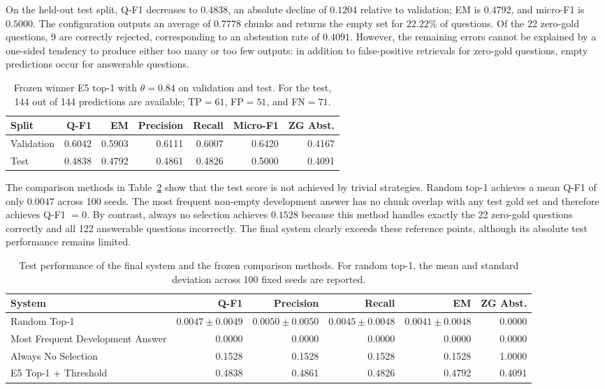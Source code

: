 \documentclass[11pt]{article}
\begin{document}
On the held-out test split, Q-F1 decreases to $0.4838$, an absolute decline of $0.1204$ relative to validation; EM is $0.4792$, and micro-F1 is $0.5000$. The configuration outputs an average of $0.7778$ chunks and returns the empty set for $22.22\%$ of questions. Of the 22 zero-gold questions, 9 are correctly rejected, corresponding to an abstention rate of $0.4091$. However, the remaining errors cannot be explained by a one-sided tendency to produce either too many or too few outputs: in addition to false-positive retrievals for zero-gold questions, empty predictions occur for answerable questions.

\begin{table}[t]
\centering
\small
\begin{tabular}{lrrrrrr}
\toprule
\textbf{Split} & \textbf{Q-F1} & \textbf{EM} & \textbf{Precision} & \textbf{Recall} & \textbf{Micro-F1} & \textbf{ZG Abst.} \\
\midrule
Validation & 0.6042 & 0.5903 & 0.6111 & 0.6007 & 0.6420 & 0.4167 \\
Test & 0.4838 & 0.4792 & 0.4861 & 0.4826 & 0.5000 & 0.4091 \\
\bottomrule
\end{tabular}
\caption{Frozen winner E5 top-1 with $\theta=0.84$ on validation and test. For the test, 144 out of 144 predictions are available; TP${}=61$, FP${}=51$, and FN${}=71$.}
\label{tab:final-system}
\end{table}

The comparison methods in Table~\ref{tab:baselines} show that the test score is not achieved by trivial strategies. Random top-1 achieves a mean Q-F1 of only $0.0047$ across 100 seeds. The most frequent non-empty development answer has no chunk overlap with any test gold set and therefore achieves Q-F1 $=0$. By contrast, always no selection achieves $0.1528$ because this method handles exactly the 22 zero-gold questions correctly and all 122 answerable questions incorrectly. The final system clearly exceeds these reference points, although its absolute test performance remains limited. 

\begin{table}[t]
\centering
\small
\setlength{\tabcolsep}{3pt}
\begin{tabular}{lrrrrr}
\toprule
\textbf{System} & \textbf{Q-F1} & \textbf{Precision} & \textbf{Recall} & \textbf{EM} & \textbf{ZG Abst.} \\
\midrule
Random Top-1 & $0.0047\pm0.0049$ & $0.0050\pm0.0050$ & $0.0045\pm0.0048$ & $0.0041\pm0.0048$ & 0.0000 \\
Most Frequent Development Answer & 0.0000 & 0.0000 & 0.0000 & 0.0000 & 0.0000 \\
Always No Selection & 0.1528 & 0.1528 & 0.1528 & 0.1528 & 1.0000 \\
E5 Top-1 + Threshold & 0.4838 & 0.4861 & 0.4826 & 0.4792 & 0.4091 \\
\bottomrule
\end{tabular}
\caption{Test performance of the final system and the frozen comparison methods. For random top-1, the mean and standard deviation across 100 fixed seeds are reported.}
\label{tab:baselines}
\end{table}
\end{document}
